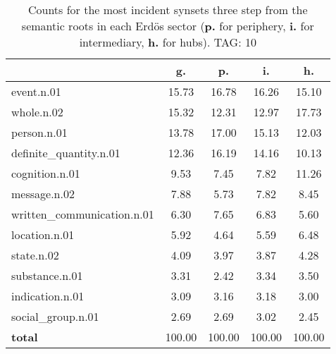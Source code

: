 \begin{table}[h!]
\begin{center}
\begin{tabular}{| l | c | c | c | c |}\hline
 & g. & p. & i. & h. \\\hline
event.n.01 & 15.73  & 16.78  & 16.26  & 15.10 \\\hline
whole.n.02 & 15.32  & 12.31  & 12.97  & 17.73 \\\hline
person.n.01 & 13.78  & 17.00  & 15.13  & 12.03 \\\hline
definite\_quantity.n.01 & 12.36  & 16.19  & 14.16  & 10.13 \\\hline
cognition.n.01 & 9.53  & 7.45  & 7.82  & 11.26 \\\hline
message.n.02 & 7.88  & 5.73  & 7.82  & 8.45 \\\hline
written\_communication.n.01 & 6.30  & 7.65  & 6.83  & 5.60 \\\hline
location.n.01 & 5.92  & 4.64  & 5.59  & 6.48 \\\hline
state.n.02 & 4.09  & 3.97  & 3.87  & 4.28 \\\hline
substance.n.01 & 3.31  & 2.42  & 3.34  & 3.50 \\\hline
indication.n.01 & 3.09  & 3.16  & 3.18  & 3.00 \\\hline
social\_group.n.01 & 2.69  & 2.69  & 3.02  & 2.45 \\\hline
{{\bf total}} & 100.00  & 100.00  & 100.00  & 100.00 \\\hline
\end{tabular}
\caption{Counts for the most incident synsets three step from the semantic roots in each Erd\"os sector ({\bf p.} for periphery, {\bf i.} for intermediary, {\bf h.} for hubs). TAG: 10}
\end{center}
\end{table}